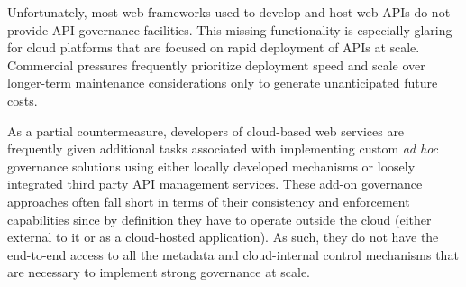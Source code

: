 Unfortunately, most web frameworks used to develop and host web APIs do not 
provide API governance facilities. This missing functionality is
especially glaring
for cloud platforms that are focused on rapid
deployment of APIs at scale.   Commercial pressures frequently prioritize
deployment speed and scale over longer-term maintenance considerations only to
generate unanticipated future costs.

As a partial countermeasure, developers of cloud-based web services are 
frequently given
additional tasks associated with 
implementing custom {\em ad hoc} governance solutions using either locally
developed mechanisms or loosely integrated
third party API management services. 
These add-on governance
approaches often fall short in terms of their consistency and enforcement
capabilities since
by definition they have to operate outside the
cloud (either external to it or as a cloud-hosted application). 
As such, they do not have the end-to-end 
access to all the metadata and cloud-internal control mechanisms
that are necessary to implement strong governance at scale. 


